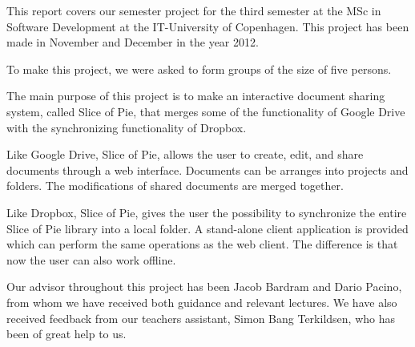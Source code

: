 This report covers our semester project for the third semester at the MSc in Software Development at the IT-University of Copenhagen. This project has been made in November and December in the year 2012. 

To make this project, we were asked to form groups of the size of five persons. 

The main purpose of this project is to make an interactive document sharing system, called Slice of Pie, that merges some of the functionality of Google Drive with the synchronizing functionality of Dropbox.
 
Like Google Drive, Slice of Pie, allows the user to create, edit, and share documents through a web interface. Documents can be arranges into projects and folders. The modifications of shared documents are merged together.

Like Dropbox, Slice of Pie, gives the user the possibility to synchronize the entire Slice of Pie library into a local folder. A stand-alone client application is provided which can perform the same operations as the web client. The difference is that now the user can also work offline.

Our advisor throughout this project has been Jacob Bardram and Dario Pacino, from whom we have received both guidance and relevant lectures. We have also received feedback from our teachers assistant, Simon Bang Terkildsen, who has been of great help to us.
